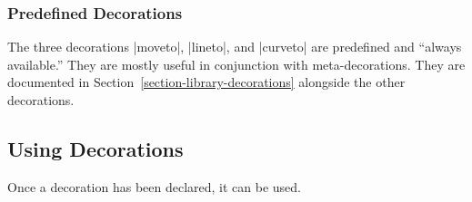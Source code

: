 \subsubsection{Predefined Decorations}

The three decorations |moveto|, |lineto|, and |curveto| are predefined
and ``always available.'' They are mostly useful in conjunction with
meta-decorations. They are documented in
Section~\ref{section-library-decorations} alongside the other
decorations.



\subsection{Using Decorations}

Once a decoration has been declared, it can be used.

